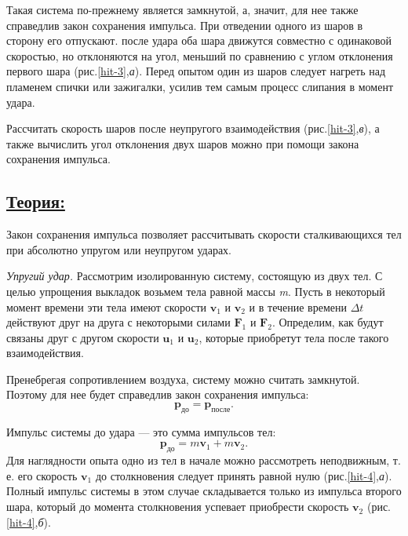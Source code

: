 \documentclass[14pt,a4paper,oneside]{extarticle}	%
\begin{document}
Такая система по-прежнему является замкнутой, а, значит, для нее также справедлив закон сохранения импульса.
При отведении одного из шаров в сторону его отпускают.
после удара оба шара движутся совместно с одинаковой скоростью, но отклоняются на угол, меньший по сравнению с углом отклонения первого шара (рис.\ref{hit-3},\textit{а}).
Перед опытом один из шаров следует нагреть над пламенем спички или зажигалки, усилив тем самым процесс слипания в момент удара.

Рассчитать скорость шаров после неупругого взаимодействия (рис.\ref{hit-3},\textit{в}), а также вычислить угол отклонения двух шаров можно при помощи закона сохранения импульса.

\newpage
\subsection*{\underline{Теория:}}

Закон сохранения импульса позволяет рассчитывать скорости сталкивающихся тел при абсолютно упругом или неупругом ударах.

\textit{Упругий удар.}
Рассмотрим изолированную систему, состоящую из двух тел.
С целью упрощения выкладок возьмем тела равной массы \textit{m}.
Пусть в некоторый момент времени эти тела имеют скорости $ \textbf{v}_1 $ и  $ \textbf{v}_2 $ и в течение 
времени $ \Delta t $ действуют друг на друга с некоторыми силами $ \textbf{F}_1 $ и $ \textbf{F}_2 $.
Определим, как будут связаны друг с другом скорости $ \textbf{u}_1 $ и $ \textbf{u}_2 $, которые приобретут 
тела после такого взаимодействия.

Пренебрегая сопротивлением воздуха, систему можно считать замкнутой.
Поэтому для нее будет справедлив закон сохранения импульса:
	\begin{equation}\label{hit-1eq1}
\textbf{p}_{\text{до}}  = \textbf{p}_{\text{после}}.
\end{equation}

Импульс системы до удара — это сумма импульсов тел:
	\begin{equation}\label{hit-1eq2}
\textbf{p}_{\text{до}}  = m \textbf{v}_1 + m \textbf{v}_2.
\end{equation}
Для наглядности опыта одно из тел в начале можно рассмотреть неподвижным, т. е. его скорость $ \textbf{v}_1 $ до столкновения следует принять равной нулю (рис.\ref{hit-4},\textit{а}).
Полный импульс системы в этом случае складывается только из импульса второго шара, который до момента столкновения успевает приобрести скорость $ \textbf{v}_2 $ (рис.\ref{hit-4},\textit{б}).
\end{document}
